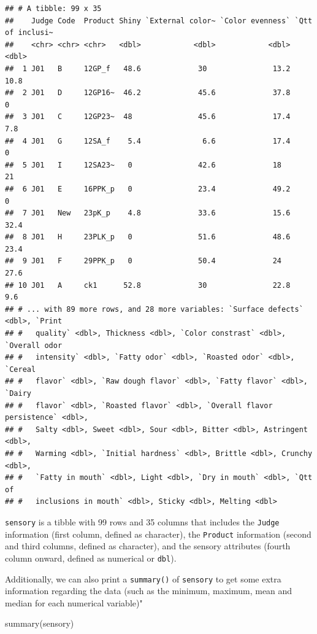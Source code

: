 \documentclass[
]{book}
\newenvironment{Shaded}{\begin{snugshade}}{\end{snugshade}}
\newcommand{\FunctionTok}[1]{\textcolor[rgb]{0.00,0.00,0.00}{#1}}
\newcommand{\NormalTok}[1]{#1}
\begin{document}
\begin{verbatim}
## # A tibble: 99 x 35
##    Judge Code  Product Shiny `External color~ `Color evenness` `Qtt of inclusi~
##    <chr> <chr> <chr>   <dbl>            <dbl>            <dbl>            <dbl>
##  1 J01   B     12GP_f   48.6             30               13.2             10.8
##  2 J01   D     12GP16~  46.2             45.6             37.8              0  
##  3 J01   C     12GP23~  48               45.6             17.4              7.8
##  4 J01   G     12SA_f    5.4              6.6             17.4              0  
##  5 J01   I     12SA23~   0               42.6             18               21  
##  6 J01   E     16PPK_p   0               23.4             49.2              0  
##  7 J01   New   23pK_p    4.8             33.6             15.6             32.4
##  8 J01   H     23PLK_p   0               51.6             48.6             23.4
##  9 J01   F     29PPK_p   0               50.4             24               27.6
## 10 J01   A     ck1      52.8             30               22.8              9.6
## # ... with 89 more rows, and 28 more variables: `Surface defects` <dbl>, `Print
## #   quality` <dbl>, Thickness <dbl>, `Color constrast` <dbl>, `Overall odor
## #   intensity` <dbl>, `Fatty odor` <dbl>, `Roasted odor` <dbl>, `Cereal
## #   flavor` <dbl>, `Raw dough flavor` <dbl>, `Fatty flavor` <dbl>, `Dairy
## #   flavor` <dbl>, `Roasted flavor` <dbl>, `Overall flavor persistence` <dbl>,
## #   Salty <dbl>, Sweet <dbl>, Sour <dbl>, Bitter <dbl>, Astringent <dbl>,
## #   Warming <dbl>, `Initial hardness` <dbl>, Brittle <dbl>, Crunchy <dbl>,
## #   `Fatty in mouth` <dbl>, Light <dbl>, `Dry in mouth` <dbl>, `Qtt of
## #   inclusions in mouth` <dbl>, Sticky <dbl>, Melting <dbl>
\end{verbatim}

\texttt{sensory} is a tibble with 99 rows and 35 columns that includes the \texttt{Judge} information (first column, defined as character), the \texttt{Product} information (second and third columns, defined as character), and the sensory attributes (fourth column onward, defined as numerical or \texttt{dbl}).

Additionally, we can also print a \texttt{summary()} of \texttt{sensory} to get some extra information regarding the data (such as the minimum, maximum, mean and median for each numerical variable)"

\begin{Shaded}
\begin{Highlighting}[]
\FunctionTok{summary}\NormalTok{(sensory)}
\end{Highlighting}
\end{Shaded}
\end{document}
